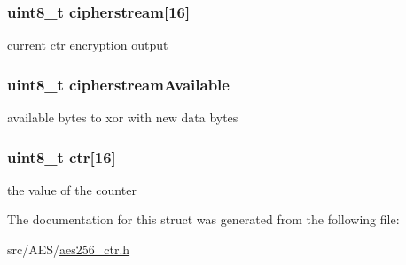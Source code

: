 \subsubsection[{\texorpdfstring{cipherstream}{cipherstream}}]{\setlength{\rightskip}{0pt plus 5cm}uint8\+\_\+t cipherstream\mbox{[}16\mbox{]}}\hypertarget{structaes256_ctr_ctx__t_a0629c0a9d7eb57c8a2da94f78e1d08a4}{}\label{structaes256_ctr_ctx__t_a0629c0a9d7eb57c8a2da94f78e1d08a4}
current ctr encryption output 
\subsubsection[{\texorpdfstring{cipherstream\+Available}{cipherstreamAvailable}}]{\setlength{\rightskip}{0pt plus 5cm}uint8\+\_\+t cipherstream\+Available}\hypertarget{structaes256_ctr_ctx__t_a37e06e9c77c1b2ee0bfc01d32cda6e38}{}\label{structaes256_ctr_ctx__t_a37e06e9c77c1b2ee0bfc01d32cda6e38}
available bytes to xor with new data bytes 
\subsubsection[{\texorpdfstring{ctr}{ctr}}]{\setlength{\rightskip}{0pt plus 5cm}uint8\+\_\+t ctr\mbox{[}16\mbox{]}}\hypertarget{structaes256_ctr_ctx__t_a5ff3a4c9ddefb040b9dabf2f939dd62a}{}\label{structaes256_ctr_ctx__t_a5ff3a4c9ddefb040b9dabf2f939dd62a}
the value of the counter 

The documentation for this struct was generated from the following file\+:\begin{DoxyCompactItemize}
\item 
src/\+A\+E\+S/\hyperlink{aes256__ctr_8h}{aes256\+\_\+ctr.\+h}\end{DoxyCompactItemize}

